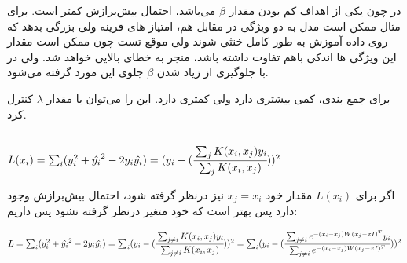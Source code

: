 \documentclass[a4paper,14pt]{extarticle}
\begin{document}
 در 
 چون یکی از اهداف کم بودن مقدار 
 $\beta$
 می‌باشد، احتمال بیش‌برازش کمتر است. برای مثال ممکن است مدل به دو ویژگی در مقابل هم،  امتیاز های قرینه ولی بزرگی بدهد که روی داده آموزش به طور کامل خنثی شوند ولی موقع تست چون ممکن است مقدار این ویژگی ها اندکی باهم تفاوت داشته باشد، منجر به خطای بالایی خواهد شد. ولی در 
 با جلوگیری از زیاد شدن 
 $\beta$
 جلوی این مورد گرفته می‌شود.
 
 برای جمع بندی، 
 کمی 
 بیشتری دارد ولی 
 کمتری دارد. این 
 را می‌توان با مقدار 
 $\lambda$
 کنترل کرد.
\newpage
{}
\subsection{}
\begin{latin}
	$
	L(x_i ) = \sum_i  (y_i ^2 + \hat{y_i}^2 - 2 y_i \hat{y_i} ) =  (y_i  - (\cfrac{\sum_j K(x_i, x_j)y_i}{\sum_j K(x_i, x_j)})) ^ 2 
	$
\end{latin}
اگر برای 
$L(x_i)$
مقدار خود 
$x_j = x_i$
نیز درنظر گرفته شود، احتمال بیش‌برازش وجود دارد پس بهتر است که خود متغیر درنظر گرفته نشود پس داریم:
\begin{latin}
	$
	L 
	=\sum_i  (y_i ^2 + \hat{y_i}^2 - 2 y_i \hat{y_i} ) 
	=  \sum_i  (y_i  - (\cfrac{\sum_{j \neq i} K(x_i, x_j)y_i}{\sum_{j \neq i} K(x_i, x_j)})) ^ 2 
	\\
	= \sum_i  (y_i  - (\cfrac{\sum_{j \neq i} e^{-(x_i - x_j)W (x_j - xI)^T } y_i}{\sum_{j \neq i} e^{-(x_i - x_j)W (x_j - xI)^T} })) ^ 2 
	$
\end{latin}
\end{document}
